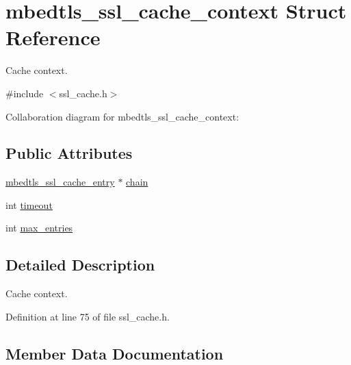 \hypertarget{structmbedtls__ssl__cache__context}{}\section{mbedtls\+\_\+ssl\+\_\+cache\+\_\+context Struct Reference}
\label{structmbedtls__ssl__cache__context}


Cache context.  




{\ttfamily \#include $<$ssl\+\_\+cache.\+h$>$}



Collaboration diagram for mbedtls\+\_\+ssl\+\_\+cache\+\_\+context\+:
\subsection*{Public Attributes}
\begin{DoxyCompactItemize}
\item 
\mbox{\hyperlink{structmbedtls__ssl__cache__entry}{mbedtls\+\_\+ssl\+\_\+cache\+\_\+entry}} $\ast$ \mbox{\hyperlink{structmbedtls__ssl__cache__context_a2039e68fc448803446e536e379638acb}{chain}}
\item 
int \mbox{\hyperlink{structmbedtls__ssl__cache__context_af5d2f556c477eb510117b4a34c02dba4}{timeout}}
\item 
int \mbox{\hyperlink{structmbedtls__ssl__cache__context_a5a490fa803aa85541cab7808db43c477}{max\+\_\+entries}}
\end{DoxyCompactItemize}


\subsection{Detailed Description}
Cache context. 

Definition at line 75 of file ssl\+\_\+cache.\+h.



\subsection{Member Data Documentation}
\mbox{\label{structmbedtls__ssl__cache__context_a2039e68fc448803446e536e379638acb}} 
